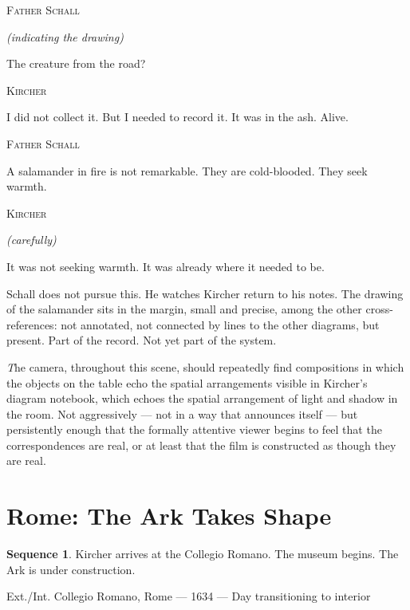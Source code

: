 \documentclass[12pt, a4paper, twoside]{memoir}
\theoremstyle{definition}
\newtheorem{sequence}{Sequence}[chapter]
\theoremstyle{remark}
\newenvironment{sceneheading}{%
  \vspace{8pt}%
  \noindent\begin{mdframed}[
    linecolor=arkgold,
    linewidth=0.8pt,
    leftmargin=0pt,
    rightmargin=0pt,
    innerleftmargin=6pt,
    innerrightmargin=6pt,
    innertopmargin=4pt,
    innerbottommargin=4pt,
    backgroundcolor=arkgold!6
  ]%
  \noindent\textsc\bgroup\small
}{%
  \egroup\end{mdframed}\vspace{4pt}%
}
\newenvironment{action}{%
  \vspace{4pt}%
  \noindent\begin{minipage}{\linewidth}%
  \setlength{\parindent}{0pt}%
  \itshape\color{kircherink}%
}{%
  \end{minipage}\vspace{6pt}%
}
\newenvironment{dialogue}[1]{%
  \vspace{6pt}%
  \noindent\hspace{24mm}%
  \begin{minipage}{0.6\linewidth}%
  \begin{center}%
  {\small\textsc{#1}}%
  \end{center}%
  \vspace{2pt}%
}{%
  \end{minipage}\vspace{6pt}%
}
\newcommand{\paren}[1]{%
  \begin{center}%
  \small\itshape\color{plaguegrey}(#1)%
  \end{center}%
}
\newenvironment{visual}{%
  \vspace{6pt}%
  \noindent\begin{mdframed}[
    linecolor=plaguegrey,
    linewidth=0.4pt,
    leftline=true, rightline=false, topline=false, bottomline=false,
    innerleftmargin=8pt,
    innerrightmargin=0pt,
    innertopmargin=2pt,
    innerbottommargin=2pt,
    backgroundcolor=white
  ]%
  \footnotesize\color{plaguegrey}\textit
}{%
  \end{mdframed}\vspace{4pt}%
}
\begin{document}
\begin{dialogue}{Father Schall}
\paren{indicating the drawing}
The creature from the road?
\end{dialogue}

\begin{dialogue}{Kircher}
I did not collect it. But I needed to record it. It was in the ash. Alive.
\end{dialogue}

\begin{dialogue}{Father Schall}
A salamander in fire is not remarkable. They are cold-blooded. They seek warmth.
\end{dialogue}

\begin{dialogue}{Kircher}
\paren{carefully}
It was not seeking warmth. It was already where it needed to be.
\end{dialogue}

\begin{action}
Schall does not pursue this. He watches Kircher return to his notes. The drawing of the salamander sits in the margin, small and precise, among the other cross-references: not annotated, not connected by lines to the other diagrams, but present. Part of the record. Not yet part of the system.
\end{action}

\begin{visual}
The camera, throughout this scene, should repeatedly find compositions in which the objects on the table echo the spatial arrangements visible in Kircher's diagram notebook, which echoes the spatial arrangement of light and shadow in the room. Not aggressively --- not in a way that announces itself --- but persistently enough that the formally attentive viewer begins to feel that the correspondences are real, or at least that the film is constructed as though they are real.
\end{visual}

\clearpage

\section{Rome: The Ark Takes Shape}

\begin{sequence}
\label{seq:rome-arrival}
Kircher arrives at the Collegio Romano. The museum begins. The Ark is under construction.
\end{sequence}

\begin{sceneheading}
Ext./Int. Collegio Romano, Rome --- 1634 --- Day transitioning to interior
\end{sceneheading}
\end{document}
